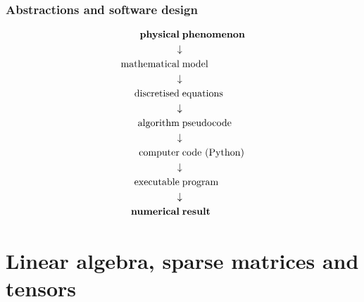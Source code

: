 \documentclass{beamer}
\begin{document}

\begin{frame}
  \frametitle{Abstractions and software design}
  $$
\begin{aligned}
\text{\textbf{physical}}\; & \text{\textbf{phenomenon}}\\
\downarrow\\
\text{mathematical}\; & \text{model}\\
\downarrow\\
\text{discretised}\; & \text{equations}\\
\downarrow\\
\text{algorithm}\; & \text{pseudocode}\\
\downarrow\\
\text{computer}\; & \text{code (Python)}\\
\downarrow\\
\text{executable}\; & \text{program}\\
\downarrow\\
\text{\textbf{numerical}}\; & \text{\textbf{result}}\\
\end{aligned}
$$
\end{frame}


\section{Linear algebra, sparse matrices and tensors}


\begin{frame}
  \tableofcontents[currentsection]
\end{frame}

\end{document}
